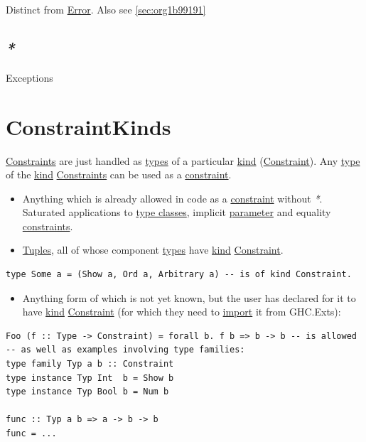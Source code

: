 \documentclass[a4paper,14pt,oneside]{book}
\begin{document}
Distinct from \hyperref[orgde98762]{Error}. Also see \ref{sec:org1b99191}

\section{\emph{*}}
\label{sec:org9ae1f97}

\label{orgeeb04e3}Exceptions

\chapter{\label{orgd01c7dc}ConstraintKinds}
\label{sec:orge975711}
\hyperref[org625aeb1]{Constraints} are just handled as \hyperref[org94fb39c]{types} of a particular \hyperref[orgba080d0]{kind} (\hyperref[orgbef2eeb]{Constraint}).
Any \hyperref[orgb67de95]{type} of the \hyperref[orgba080d0]{kind} \hyperref[org625aeb1]{Constraints} can be used as a \hyperref[orgbef2eeb]{constraint}.
\begin{itemize}
\item Anything which is already allowed in code as a \hyperref[orgbef2eeb]{constraint} without \emph{*}. Saturated applications to \hyperref[org018177f]{type classes}, implicit \hyperref[org8d054fe]{parameter} and equality \hyperref[org625aeb1]{constraints}.
\item \hyperref[orgd0ab570]{Tuples}, all of whose component \hyperref[org94fb39c]{types} have \hyperref[orgba080d0]{kind} \hyperref[orgbef2eeb]{Constraint}.
\end{itemize}
\begin{verbatim}
type Some a = (Show a, Ord a, Arbitrary a) -- is of kind Constraint.
\end{verbatim}
\begin{itemize}
\item Anything form of which is not yet known, but the user has declared for it to have \hyperref[orgba080d0]{kind} \hyperref[orgbef2eeb]{Constraint} (for which they need to \hyperref[org2ffaf8b]{import} it from GHC.Exts):
\end{itemize}
\begin{verbatim}
Foo (f :: Type -> Constraint) = forall b. f b => b -> b -- is allowed
-- as well as examples involving type families:
type family Typ a b :: Constraint
type instance Typ Int  b = Show b
type instance Typ Bool b = Num b

func :: Typ a b => a -> b -> b
func = ...
\end{verbatim}
\end{document}
